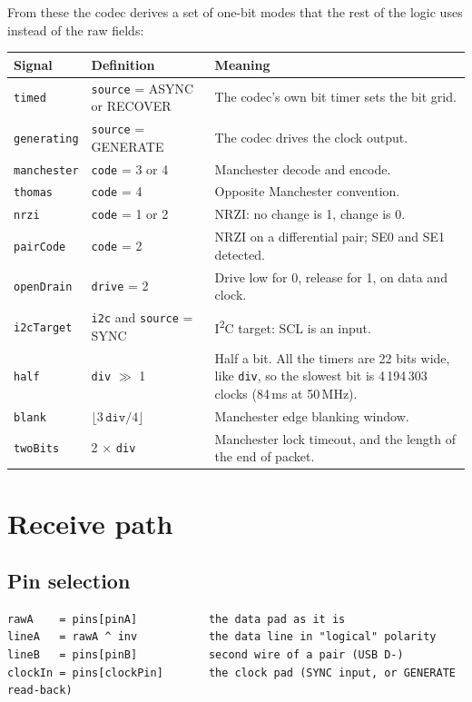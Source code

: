 \documentclass[11pt,a4paper]{article}
\newcommand{\sig}[1]{\texttt{#1}}
\begin{document}
From these the codec derives a set of one-bit modes that the rest of the logic uses instead of the raw fields:

\begin{center}
\begin{tabularx}{\linewidth}{@{}l l L@{}}
\toprule
Signal & Definition & Meaning \\
\midrule
\sig{timed} & \sig{source} = ASYNC or RECOVER & The codec's own bit timer sets the bit grid. \\
\sig{generating} & \sig{source} = GENERATE & The codec drives the clock output. \\
\sig{manchester} & \sig{code} = 3 or 4 & Manchester decode and encode. \\
\sig{thomas} & \sig{code} = 4 & Opposite Manchester convention. \\
\sig{nrzi} & \sig{code} = 1 or 2 & NRZI: no change is 1, change is 0. \\
\sig{pairCode} & \sig{code} = 2 & NRZI on a differential pair; SE0 and SE1 detected. \\
\sig{openDrain} & \sig{drive} = 2 & Drive low for 0, release for 1, on data and clock. \\
\sig{i2cTarget} & \sig{i2c} and \sig{source} = SYNC & I\textsuperscript{2}C target: SCL is an input. \\
\sig{half} & \sig{div} $\gg$ 1 & Half a bit. All the timers are 22 bits wide, like \sig{div}, so the slowest bit is 4\,194\,303 clocks (84\,ms at 50\,MHz). \\
\sig{blank} & $\lfloor 3\,\sig{div} / 4 \rfloor$ & Manchester edge blanking window. \\
\sig{twoBits} & 2 $\times$ \sig{div} & Manchester lock timeout, and the length of the end of packet. \\
\bottomrule
\end{tabularx}
\end{center}

\section{Receive path}

\subsection{Pin selection}

\begin{lstlisting}
rawA    = pins[pinA]           the data pad as it is
lineA   = rawA ^ inv           the data line in "logical" polarity
lineB   = pins[pinB]           second wire of a pair (USB D-)
clockIn = pins[clockPin]       the clock pad (SYNC input, or GENERATE read-back)
\end{lstlisting}
\end{document}
